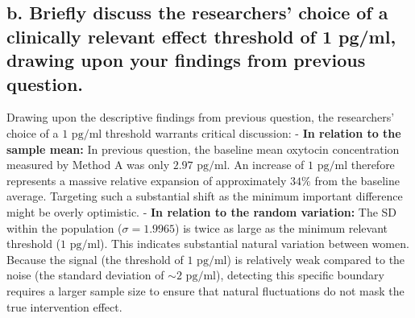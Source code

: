 \documentclass[
]{article}
\begin{document}
\subsection{b. Briefly discuss the researchers' choice of a clinically
relevant effect threshold of 1 pg/ml, drawing upon your findings from
previous
question.}\label{b.-briefly-discuss-the-researchers-choice-of-a-clinically-relevant-effect-threshold-of-1-pgml-drawing-upon-your-findings-from-previous-question.}

Drawing upon the descriptive findings from previous question, the
researchers' choice of a \(1\text{ pg/ml}\) threshold warrants critical
discussion: - \textbf{In relation to the sample mean:} In previous
question, the baseline mean oxytocin concentration measured by Method A
was only \(2.97\text{ pg/ml}\). An increase of \(1\text{ pg/ml}\)
therefore represents a massive relative expansion of approximately
\(34\%\) from the baseline average. Targeting such a substantial shift
as the minimum important difference might be overly optimistic. -
\textbf{In relation to the random variation:} The SD within the
population (\(\sigma = 1.9965\)) is twice as large as the minimum
relevant threshold (\(1\text{ pg/ml}\)). This indicates substantial
natural variation between women. Because the signal (the threshold of
\(1\text{ pg/ml}\)) is relatively weak compared to the noise (the
standard deviation of \(\sim 2\text{ pg/ml}\)), detecting this specific
boundary requires a larger sample size to ensure that natural
fluctuations do not mask the true intervention effect.
\end{document}
